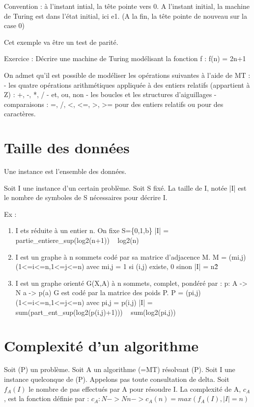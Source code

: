 \documentclass{article}
\begin{document}
Convention : à l'instant intial, la tête pointe vers 0. A l'instant initial, la machine de Turing est dans l'état initial, ici e1. (A la fin, la tête pointe de nouveau sur la case 0)

Cet exemple va être un test de parité.

Exercice : Décrire une machine de Turing modélisant la fonction f : f(n) = 2n+1

On admet qu'il est possible de modéliser les opérations suivantes à l'aide de MT :
    - les quatre opérations arithmétiques appliquée à des entiers relatifs (appartient à Z) : +, -, *, /
    - et, ou, non
    - les boucles et les structures d'aiguillages
    - comparaisons : =, /, <, <=, >, >= pour des entiers relatifs ou pour des caractères.


\section{Taille des données}
    Une instance est l'ensemble des données.

    Soit I une instance d'un certain problème.
    Soit S fixé.
    La taille de I, notée |I| est le nombre de symboles de S nécessaires pour décrire I.
    
Ex : \begin{enumerate}
     \item I ets réduite à un entier n.
        On fixe S=\{0,1,b\}
	|I| = partie\_entiere\_sup(log2(n+1))
	    ~ log2(n)

     \item I est un graphe à n sommets codé par sa matrice d'adjacence M.
        M = (mi,j)(1<=i<=n,1<=j<=n)
	avec mi,j = 1 si (i,j) existe, 0 sinon
	|I| = n\^2

     \item I est un graphe orienté G(X,A) à n sommets, complet, pondéré par :
       p: A -> N
          a -> p(a)
       G est codé par la matrice des poids P.
       P = (pi,j)(1<=i<=n,1<=j<=n)
       avec pi,j = p(i,j)
       |I| = sum(part\_ent\_sup(log2(p(i,j)+1)))
           ~ sum(log2(pi,j))
    \end{enumerate}

\section{Complexité d'un algorithme}
    Soit (P) un problème. Soit A un algorithme (=MT) résolvant (P). Soit I une instance quelconque de (P). Appelons pas toute consultation de delta. Soit $f_A(I)$ le nombre de pas effectués par A pour résoudre I. La complexité de A, $c_A$, est la fonction définie par :
        $c_A : N ->N
	      n -> c_A(n) = max(f_A(I), |I| = n)$
\end{document}
